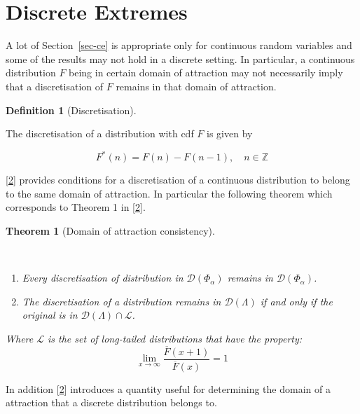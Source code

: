 \documentclass[
  10pt,
  a4paper,
]{scrreprt}
\providecommand{\tightlist}{%
  \setlength{\itemsep}{0pt}\setlength{\parskip}{0pt}}\usepackage{longtable,booktabs,array}
\theoremstyle{plain}
\theoremstyle{plain}
\theoremstyle{definition}
\newtheorem{definition}{Definition}[section]
\theoremstyle{plain}
\newtheorem{theorem}{Theorem}[section]
\theoremstyle{remark}
\begin{document}
{\hypertarget{sec-disc}{%
\section{Discrete Extremes}\label{sec-disc}}

A lot of Section~\ref{sec-ce} is appropriate only for continuous random
variables and some of the results may not hold in a discrete setting. In
particular, a continuous distribution \(F\) being in certain domain of
attraction may not necessarily imply that a discretisation of \(F\)
remains in that domain of attraction.

\begin{definition}[Discretisation]\protect\hypertarget{def-disc}{}\label{def-disc}

The discretisation of a distribution with cdf \(F\) is given by

\[F^*(n) = F(n) - F(n-1), \quad n   \in \mathbb Z\]

\end{definition}

{[}\protect\hyperlink{ref-shimura12}{2}{]} provides conditions for a
discretisation of a continuous distribution to belong to the same domain
of attraction. In particular the following theorem which corresponds to
Theorem 1 in {[}\protect\hyperlink{ref-shimura12}{2}{]}.

\begin{theorem}[Domain of attraction
consistency]\protect\hypertarget{thm-shimura1}{}\label{thm-shimura1}

~

\begin{enumerate}
\def\labelenumi{(\alph{enumi})}
\tightlist
\item
  Every discretisation of distribution in \(\mathcal D(\Phi_\alpha)\)
  remains in \(\mathcal D(\Phi_\alpha)\).
\item
  The discretisation of a distribution remains in
  \(\mathcal D(\Lambda)\) if and only if the original is in
  \(\mathcal D(\Lambda)\cap \mathcal L\).
\end{enumerate}

Where \(\mathcal L\) is the set of long-tailed distributions that have
the property: \[
\lim_{x\rightarrow \infty}\displaystyle\frac{\overline F(x+1)}{\overline F(x)} = 1   
\]

\end{theorem}

In addition {[}\protect\hyperlink{ref-shimura12}{2}{]} introduces a
quantity useful for determining the domain of a attraction that a
discrete distribution belongs to.

}
\end{document}
